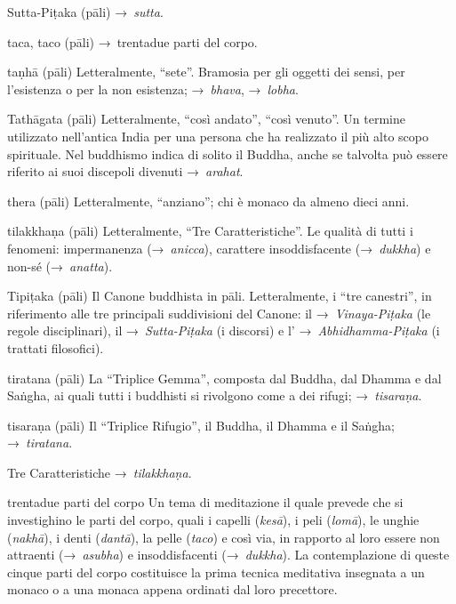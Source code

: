 \begin{glossarydescription}
\item[Sutta-Piṭaka] (pāli) →~\emph{sutta}.


\item[taca, taco] (pāli) →~trentadue parti del corpo.

\item[taṇhā] (pāli) Letteralmente, ``sete''. Bramosia per gli oggetti dei sensi,
  per l'esistenza o per la non esistenza; →~\emph{bhava}, →~\emph{lobha}.

\item[Tathāgata] (pāli) Letteralmente, ``così andato'', ``così venuto''. Un
  termine utilizzato nell'antica India per una persona che ha realizzato il più
  alto scopo spirituale. Nel buddhismo indica di solito il Buddha, anche se
  talvolta può essere riferito ai suoi discepoli divenuti →~\emph{arahat}.

\item[thera] (pāli) Letteralmente, ``anziano''; chi è monaco da almeno dieci
  anni.

\item[tilakkhaṇa] (pāli)\label{glossary-tilakkhana} Letteralmente, ``Tre Caratteristiche''. Le qualità di
  tutti i fenomeni: impermanenza (→~\emph{anicca}), carattere insoddisfacente
  (→~\emph{dukkha}) e non-sé (→~\emph{anatta}).

\item[Tipiṭaka] (pāli) Il Canone buddhista in pāli. Letteralmente, i ``tre
  canestri'', in riferimento alle tre principali suddivisioni del Canone: il
  →~\emph{Vinaya-Piṭaka} (le regole disciplinari), il →~\emph{Sutta-Piṭaka} (i
  discorsi) e l' →~\emph{Abhidhamma-Piṭaka} (i trattati filosofici).

\item[tiratana] (pāli) La ``Triplice Gemma'', composta dal Buddha, dal Dhamma e
  dal Saṅgha, ai quali tutti i buddhisti si rivolgono come a dei rifugi;
  →~\emph{tisaraṇa}.

\item[tisaraṇa] (pāli) Il ``Triplice Rifugio'', il Buddha, il Dhamma e il
  Saṅgha; →~\emph{tiratana}.

\item[Tre Caratteristiche] →~\emph{tilakkhaṇa}.

\item[trentadue parti del corpo] Un tema di meditazione il quale prevede che si
  investighino le parti del corpo, quali i capelli (\emph{kesā}), i peli
  (\emph{lomā}), le unghie (\emph{nakhā}), i denti (\emph{dantā}), la pelle
  (\emph{taco}) e così via, in rapporto al loro essere non attraenti
  (→~\emph{asubha}) e insoddisfacenti (→~\emph{dukkha}). La contemplazione di
  queste cinque parti del corpo costituisce la prima tecnica meditativa
  insegnata a un monaco o a una monaca appena ordinati dal loro precettore.


\end{glossarydescription}
